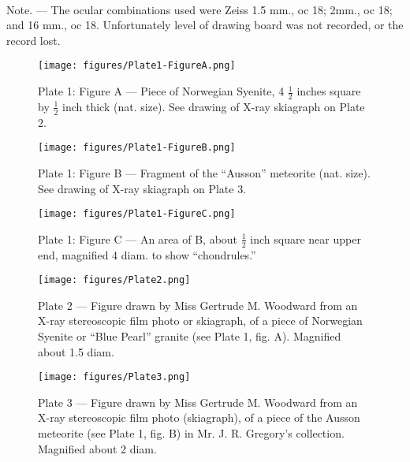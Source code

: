 \documentclass[a4paper, 12pt, oneside]{article}
\begin{document}
\paragraph{}
Note. --- The ocular combinations used were Zeiss 1.5 mm., oc 18; 2mm., oc 18; and 16 mm., oc 18. Unfortunately level of drawing board was not recorded, or the record lost.
\clearpage
\pagestyle{fancy}
\fancyhf{}
\cfoot{\thepage}
\begin{figure}[b]
\centering
\texttt{[image: figures/Plate1-FigureA.png]}
\caption{\small Plate 1: Figure A --- Piece of Norwegian Syenite, 4 $\frac{1}{2}$ inches square by $\frac{1}{2}$ inch thick (nat. size). See drawing of X-ray skiagraph on Plate 2.}
\end{figure}
\clearpage
\begin{figure}[b]
\centering
\texttt{[image: figures/Plate1-FigureB.png]}
\caption{\small Plate 1: Figure B --- Fragment of the ``Ausson'' meteorite (nat. size). See drawing of X-ray skiagraph on Plate 3.}
\end{figure}
\clearpage
\begin{figure}[b]
\centering
\texttt{[image: figures/Plate1-FigureC.png]}
\caption{\small Plate 1: Figure C --- An area of B, about $\frac{1}{2}$ inch square near upper end, magnified 4 diam. to show ``chondrules.''}
\end{figure}
\clearpage
{}
\cfoot{\thepage}
\begin{figure}[b]
\centering
\texttt{[image: figures/Plate2.png]}
\caption{\small Plate 2 --- Figure drawn by Miss Gertrude M. Woodward from an X-ray stereoscopic film photo or skiagraph, of a piece of Norwegian Syenite or ``Blue Pearl'' granite (see Plate 1, fig. A). Magnified about 1.5 diam.}
\end{figure}
\clearpage
{}
\cfoot{\thepage}
\begin{figure}[b]
\centering
\texttt{[image: figures/Plate3.png]}
\caption{\small Plate 3 --- Figure drawn by Miss Gertrude M. Woodward from an X-ray stereoscopic film photo (skiagraph), of a piece of the Ausson meteorite (see Plate 1, fig. B) in Mr. J. R. Gregory's collection. Magnified about 2 diam.}
\end{figure}
\clearpage
{}
\cfoot{\thepage}
\end{document}

